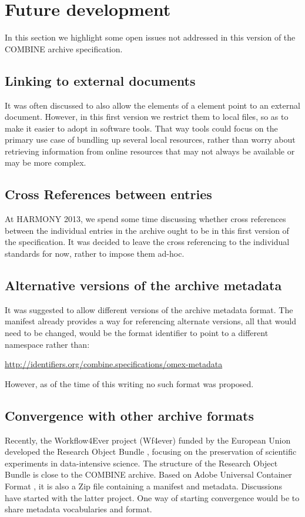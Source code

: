
\section{Future development}
\label{future}
In this section we highlight some open issues not addressed in this 
version of the COMBINE archive specification. 


\subsection{Linking to external documents}
It was often discussed to also allow the  elements of a 
\Content element point to an external document. However, in this first 
version we restrict them to local files, so as to make it easier to 
adopt in software tools. That way tools could focus on the primary use 
case of bundling up several local resources, rather than worry about 
retrieving information from online resources that may not always be 
available or may be more complex.

\subsection{Cross References between entries}
At HARMONY 2013, we spend some time discussing whether cross references 
between the individual entries in the archive ought to be in this first 
version of the specification. It was decided to leave the cross 
referencing to the individual standards for now, rather to impose them 
ad-hoc. 

\subsection{Alternative versions of the archive metadata}
It was suggested to allow different versions of the archive metadata 
format. The manifest already provides a way for referencing alternate 
versions, all that would need to be changed, would be the format 
identifier to point to a different namespace rather than: 


\url{http://identifiers.org/combine.specifications/omex-metadata}

However, as of the time of this writing no such format was proposed.

\subsection{Convergence with other archive formats}
Recently, the Workflow4Ever project (Wf4ever) funded by the European Union 
developed the Research Object Bundle \citep{ro2013}, focusing on the preservation
of scientific experiments in data-intensive science. The structure of the 
Research Object Bundle is close to the COMBINE archive. Based on Adobe 
Universal Container Format \citep{ucf}, it is also a Zip file containing 
a manifest and metadata. Discussions have started with the latter project. 
One way of starting convergence would be to share metadata vocabularies and format. 


